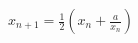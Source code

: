 \documentclass[preview]{standalone}
\begin{document}
\begin{align*}
x_{n+1} = \frac{1}{2}(x_n + \frac{a}{x_n})
\end{align*}
\end{document}

